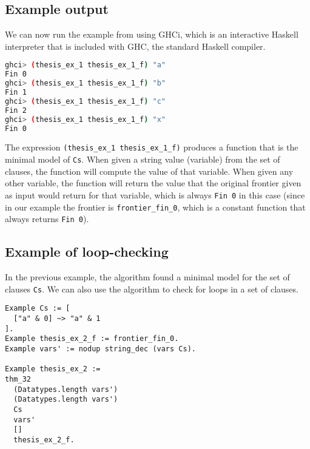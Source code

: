 \subsection{Example output}
\label{sssec:example_output}

We can now run the example from  using GHCi,
which is an interactive Haskell interpreter that is included with GHC, the standard Haskell compiler.

\begin{minipage}{\linewidth}
\begin{lstlisting}[language=bash, label={lst:thm_32_haskell_output}, caption={\lstinline{thm_32} example output}]
ghci> (thesis_ex_1 thesis_ex_1_f) "a"
Fin 0
ghci> (thesis_ex_1 thesis_ex_1_f) "b"
Fin 1
ghci> (thesis_ex_1 thesis_ex_1_f) "c"
Fin 2
ghci> (thesis_ex_1 thesis_ex_1_f) "x"
Fin 0
\end{lstlisting}
\end{minipage}

The expression \lstinline[language=Haskell]{(thesis_ex_1 thesis_ex_1_f)} produces a function that is the minimal model of \lstinline{Cs}.
When given a string value (variable) from the set of clauses, the function will compute the value of that variable.
When given any other variable, the function will return the value that the original frontier given as input
would return for that variable, which is always \lstinline{Fin 0} in this case
(since in our example the frontier is \lstinline{frontier_fin_0},
which is a constant function that always returns \lstinline{Fin 0}).

\subsection{Example of loop-checking}

In the previous example, the algorithm found a minimal model for the set of clauses \lstinline{Cs}.
We can also use the algorithm to check for loops in a set of clauses.

\begin{minipage}{\linewidth}
\begin{lstlisting}[language=Coq, label={lst:loop_checking_example}, caption={Loop-checking example}]
Example Cs := [
  ["a" & 0] ~> "a" & 1
].
Example thesis_ex_2_f := frontier_fin_0.
Example vars' := nodup string_dec (vars Cs).

Example thesis_ex_2 :=
thm_32
  (Datatypes.length vars')
  (Datatypes.length vars')
  Cs
  vars'
  []
  thesis_ex_2_f.
\end{lstlisting}
\end{minipage}

